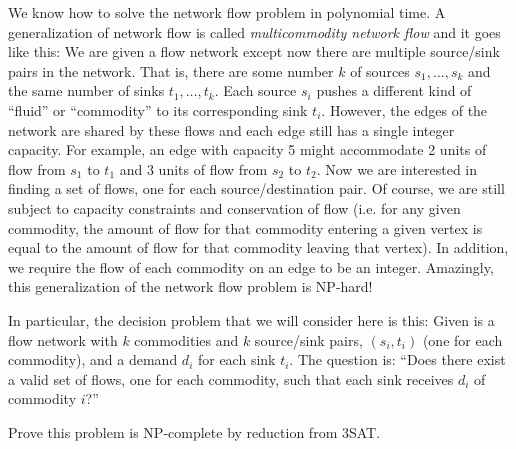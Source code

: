 \documentclass[12 pt, letterpaper]{hmcpset}
\begin{document}
\pagebreak

\begin{problem}
	We know how to solve the network flow problem in polynomial time.  A generalization of
		network flow is called \emph{multicommodity network flow} and it goes like this:
		We are given a flow network except now there are multiple source/sink pairs in the network.
		That is, there are some number $k$ of sources $s_1, \dots, s_k$ and the same number of sinks $t_1, \dots, t_k$.
		Each source $s_i$ pushes a different kind of ``fluid'' or ``commodity'' to its corresponding sink $t_i$.  However, the edges of the network are shared by these flows and each edge still has a single
		integer capacity.  For example, an edge with capacity 5 might accommodate 2 units of flow from $s_1$ to $t_1$ and 3 units of flow from $s_2$ to $t_2$.  Now we are interested in finding a set of flows, one for each source/destination pair.  Of course, we are still subject to capacity constraints and conservation of flow (i.e. for any given commodity, the amount of flow for that commodity entering a given vertex is equal to the amount of flow for that commodity leaving that vertex).  In addition, we require the flow of each commodity on an edge to be an integer.  Amazingly, this generalization of the network flow problem is NP-hard!
		 
	   In particular, the decision problem that we will consider here is this:  Given is a flow network with $k$ commodities and $k$ source/sink pairs, $(s_i, t_i)$ (one for each commodity), and a demand $d_i$ for each sink $t_i$.  The question is:  ``Does there exist a valid set of flows, one for each commodity, such that each sink receives $d_i$ of commodity $i$?''
		
		Prove this problem is NP-complete by reduction from 3SAT.
\end{problem}
\end{document}
